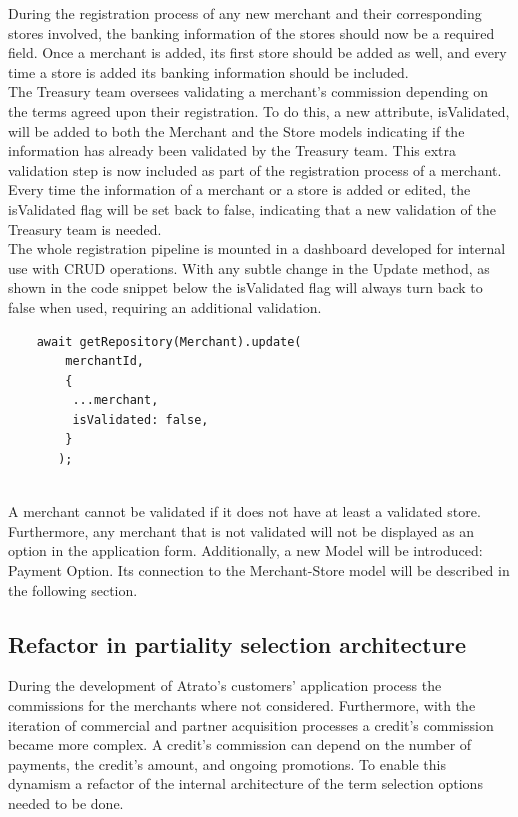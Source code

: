 During the registration process of any new merchant and their corresponding stores involved, the banking information of the stores should now be a required field. Once a merchant is added, its first store should be added as well, and every time a store is added its banking information should be included.\\

The Treasury team oversees validating a merchant’s commission depending on the terms agreed upon their registration. To do this, a new attribute, isValidated, will be added to both the Merchant and the Store models indicating if the information has already been validated by the Treasury team. This extra validation step is now included as part of the registration process of a merchant. Every time the information of a merchant or a store is added or edited, the isValidated flag will be set back to false, indicating that a new validation of the Treasury team is needed.\\

The whole registration pipeline is mounted in a dashboard developed for internal use with CRUD operations. With any subtle change in the Update method, as shown in the code snippet below the isValidated flag will always turn back to false when used, requiring an additional validation.

\begin{verbatim}
    await getRepository(Merchant).update(
        merchantId,
        {
         ...merchant,
         isValidated: false,
        }
       );
       
\end{verbatim}

A merchant cannot be validated if it does not have at least a validated store. Furthermore, any merchant that is not validated will not be displayed as an option in the application form.  Additionally, a new Model will be introduced: Payment Option. Its connection to the Merchant-Store model will be described in the following section.

\subsection{Refactor in partiality selection architecture}

During the development of Atrato’s customers’ application process the commissions for the merchants where not considered. Furthermore, with the iteration of commercial and partner acquisition processes a credit’s commission became more complex. A credit’s commission can depend on the number of payments, the credit’s amount, and ongoing promotions. To enable this dynamism a refactor of the internal architecture of the term selection options needed to be done.\\

